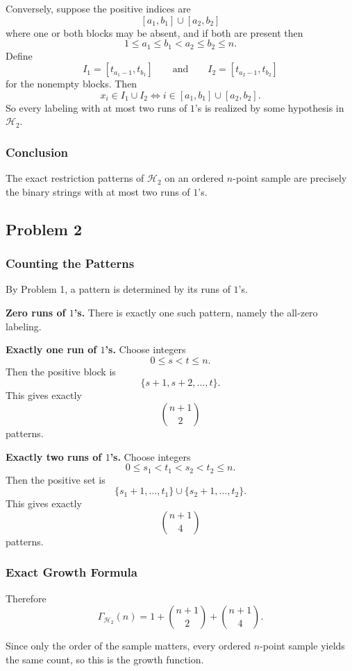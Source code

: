 \documentclass{article}
\begin{document}
Conversely, suppose the positive indices are
$$
[a_1,b_1] \cup [a_2,b_2]
$$
where one or both blocks may be absent, and if both are present then
$$
1 \le a_1 \le b_1 < a_2 \le b_2 \le n.
$$
Define
$$
I_1 = [t_{a_1-1}, t_{b_1}]
\qquad \text{and} \qquad
I_2 = [t_{a_2-1}, t_{b_2}]
$$
for the nonempty blocks. Then
$$
x_i \in I_1 \cup I_2
\iff
i \in [a_1,b_1] \cup [a_2,b_2].
$$
So every labeling with at most two runs of $1$'s is realized by some hypothesis in $\mathcal{H}_2$.

\subsubsection{Conclusion}

The exact restriction patterns of $\mathcal{H}_2$ on an ordered $n$-point sample are precisely the binary strings with at most two runs of $1$'s.

\subsection{Problem 2}

\subsubsection{Counting the Patterns}

By Problem 1, a pattern is determined by its runs of $1$'s.

\textbf{Zero runs of $1$'s.}
There is exactly one such pattern, namely the all-zero labeling.

\textbf{Exactly one run of $1$'s.}
Choose integers
$$
0 \le s < t \le n.
$$
Then the positive block is
$$
\{s+1,s+2,\dots,t\}.
$$
This gives exactly
$$
\binom{n+1}{2}
$$
patterns.

\textbf{Exactly two runs of $1$'s.}
Choose integers
$$
0 \le s_1 < t_1 < s_2 < t_2 \le n.
$$
Then the positive set is
$$
\{s_1+1,\dots,t_1\} \cup \{s_2+1,\dots,t_2\}.
$$
This gives exactly
$$
\binom{n+1}{4}
$$
patterns.

\subsubsection{Exact Growth Formula}

Therefore
$$
\Gamma_{\mathcal{H}_2}(n)
=
1 + \binom{n+1}{2} + \binom{n+1}{4}.
$$

Since only the order of the sample matters, every ordered $n$-point sample yields the same count, so this is the growth function.
\end{document}
